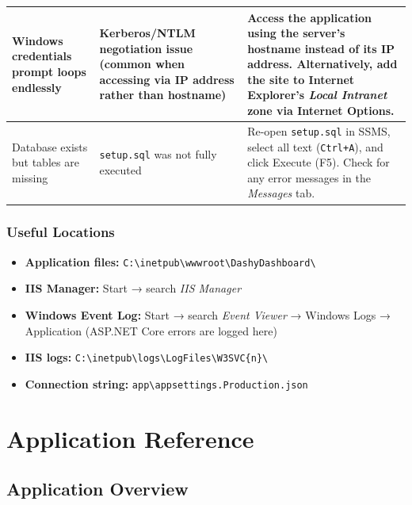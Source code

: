 \documentclass[12pt,a4paper]{report}
\begin{document}
\begin{longtable}{>{\raggedright\arraybackslash}p{4.5cm} >{\raggedright\arraybackslash}p{4.5cm} >{\raggedright\arraybackslash}p{5.5cm}}
\midrule

Windows credentials prompt loops endlessly &
Kerberos/NTLM negotiation issue (common when accessing via IP address rather than hostname) &
Access the application using the server's hostname instead of its IP address. Alternatively, add the site to Internet Explorer's \emph{Local Intranet} zone via Internet Options. \\

\midrule

Database exists but tables are missing &
\texttt{setup.sql} was not fully executed &
Re-open \texttt{setup.sql} in SSMS, select all text (\texttt{Ctrl+A}), and click Execute (F5). Check for any error messages in the \emph{Messages} tab. \\

\bottomrule
\end{longtable}

\section{Useful Locations}

\begin{itemize}
  \item \textbf{Application files:} \texttt{C:\textbackslash inetpub\textbackslash wwwroot\textbackslash DashyDashboard\textbackslash}
  \item \textbf{IIS Manager:} Start → search \emph{IIS Manager}
  \item \textbf{Windows Event Log:} Start → search \emph{Event Viewer} → Windows Logs → Application (ASP.NET Core errors are logged here)
  \item \textbf{IIS logs:} \texttt{C:\textbackslash inetpub\textbackslash logs\textbackslash LogFiles\textbackslash W3SVC\{n\}\textbackslash}
  \item \textbf{Connection string:} \texttt{app\textbackslash appsettings.Production.json}
\end{itemize}

\part{Application Reference}

\chapter{Application Overview}
\end{document}
